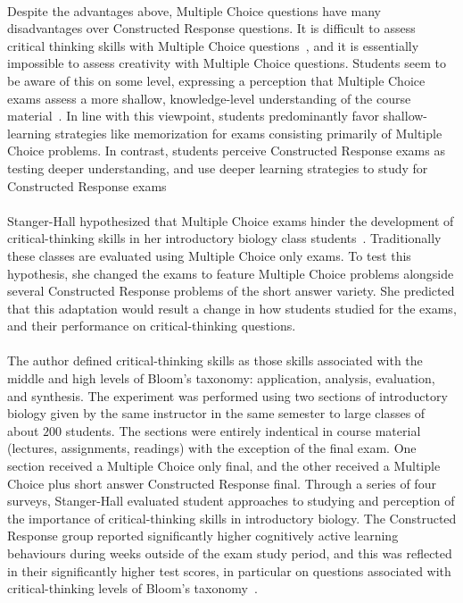 \documentclass[12pt]{article}
\begin{document}
\paragraph{}
Despite the advantages above, Multiple Choice questions have many disadvantages over Constructed Response questions. It is difficult to assess critical thinking skills with Multiple Choice questions~\cite{martinez1999cognition}, and it is essentially impossible to assess creativity with Multiple Choice questions. Students seem to be aware of this on some level, expressing a perception that Multiple Choice exams assess a more shallow, knowledge-level understanding of the course material~\cite{scouller1998influence}. In line with this viewpoint, students predominantly favor shallow-learning strategies like memorization for exams consisting primarily of Multiple Choice problems. In contrast, students perceive Constructed Response exams as testing deeper understanding, and use deeper learning strategies to study for Constructed Response exams~\cite{scouller1998influence}
\paragraph{}
Stanger-Hall hypothesized that Multiple Choice exams hinder the development of critical-thinking skills in her introductory biology class students~\cite{stanger2012multiple}. Traditionally these classes are evaluated using Multiple Choice only exams. To test this hypothesis, she changed the exams to feature Multiple Choice problems alongside several Constructed Response problems of the short answer variety. She predicted that this adaptation would result a change in how students studied for the exams, and their performance on critical-thinking questions.
\paragraph{}
The author defined critical-thinking skills as those skills associated with the middle and high levels of Bloom's taxonomy: application, analysis, evaluation, and synthesis. The experiment was performed using two sections of introductory biology given by the same instructor in the same semester to large classes of about $200$ students. The sections were entirely indentical in course material (lectures, assignments, readings) with the exception of the final exam. One section received a Multiple Choice only final, and the other received a Multiple Choice plus short answer Constructed Response final. Through a series of four surveys, Stanger-Hall evaluated student approaches to studying and perception of the importance of critical-thinking skills in introductory biology. The Constructed Response group reported significantly higher cognitively active learning behaviours during weeks outside of the exam study period, and this was reflected in their significantly higher test scores, in particular on questions associated with critical-thinking levels of Bloom's taxonomy~\cite{stanger2012multiple}.
\end{document}
